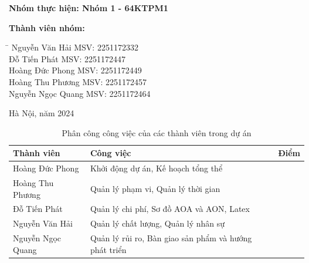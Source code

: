 \begin{titlepage}
\begin{flushleft}
    \textbf{Nhóm thực hiện: Nhóm 1 - 64KTPM1}
\end{flushleft}

\begin{flushleft}
    \textbf{Thành viên nhóm:}
\end{flushleft}

\begin{flushleft}
    \begin{tabbing}
        \hspace{4cm}\= \hspace{8cm} \kill %
        Nguyễn Văn Hải\> MSV: 2251172332\\
        Đỗ Tiến Phát\> MSV: 2251172447\\
        Hoàng Đức Phong\> MSV: 2251172449\\
        Hoàng Thu Phương\> MSV: 2251172457\\
        Nguyễn Ngọc Quang\> MSV: 2251172464\\
    \end{tabbing}
\end{flushleft}

\begin{center}
    \vfill
    Hà Nội, năm 2024
\end{center}

\end{titlepage}

\newpage %

\begin{table}[h!]
\centering
\renewcommand{\arraystretch}{1.5} %
\setlength{\tabcolsep}{10pt}      %
\large                            %
\begin{tabular}{|l|p{9cm}|c|}
\hline
\textbf{Thành viên}      & \textbf{Công việc}                                                                                      & \textbf{Điểm} \\ \hline
Hoàng Đức Phong          & Khởi động dự án, Kế hoạch tổng thể                                                                     &               \\ \hline
Hoàng Thu Phương         & Quản lý phạm vi, Quản lý thời gian                                                                      &               \\ \hline
Đỗ Tiến Phát             & Quản lý chi phí, Sơ đồ AOA và AON, Latex                                                               &               \\ \hline
Nguyễn Văn Hải           & Quản lý chất lượng, Quản lý nhân sự                                                                    &               \\ \hline
Nguyễn Ngọc Quang        & Quản lý rủi ro, Bàn giao sản phẩm và hướng phát triển                                                  &               \\ \hline
\end{tabular}
\caption{Phân công công việc của các thành viên trong dự án}
\label{tab:phancong}
\end{table}

